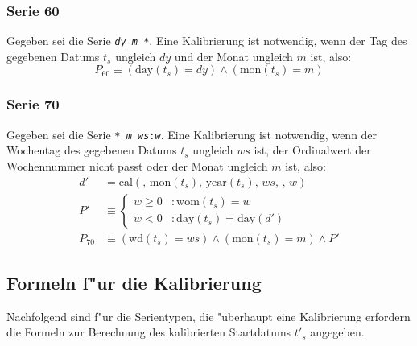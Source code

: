 \documentclass[a4paper]{article}
\newcommand*{\dayf}{\mathrm{day}}
\newcommand*{\monf}{\mathrm{mon}}
\newcommand*{\yearf}{\mathrm{year}}
\newcommand*{\wdf}{\mathrm{wd}}
\newcommand*{\womf}{\mathrm{wom}}
\newcommand*{\calf}{\mathrm{cal}}
\numberwithin{equation}{section}
\begin{document}
\subsubsection{Serie 60}
Gegeben sei die Serie \texttt{\textit{dy} \textit{m} *}. Eine Kalibrierung ist
notwendig, wenn der Tag des gegebenen Datums $t_s$ ungleich $dy$ und der Monat
ungleich $m$ ist, also:
\begin{equation}
  P_{60} \equiv (\dayf(t_s) = dy) \wedge (\monf(t_s) = m)
\end{equation}

\subsubsection{Serie 70}
Gegeben sei die Serie \texttt{* \textit{m} \textit{ws}:\textit{w}}. Eine
Kalibrierung ist notwendig, wenn der Wochentag des gegebenen Datums $t_s$
ungleich $ws$ ist, der Ordinalwert der Wochennummer nicht passt oder der Monat
ungleich $m$ ist, also:
\begin{equation}
\begin{split}
  d' & = \calf(,\,\monf(t_s),\,\yearf(t_s),\,ws,\,,\,w) \\
  P' & \equiv \left\{\begin{array}{ll}
      w \ge 0 & : \womf(t_s) = w \\
      w < 0 & : \dayf(t_s) = \dayf(d')
    \end{array}\right. \\
  P_{70} & \equiv (\wdf(t_s) = ws) \wedge (\monf(t_s) = m) \wedge P'
\end{split}
\end{equation}


%
%
\subsection{Formeln f"ur die Kalibrierung}
Nachfolgend sind f"ur die Serientypen, die "uberhaupt eine Kalibrierung
erfordern die Formeln zur Berechnung des kalibrierten Startdatums $t'_s$
angegeben.
\end{document}
